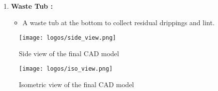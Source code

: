 \documentclass[table,french,english]{rapportCS}
\begin{document}
\begin{enumerate}[label=\arabic*.]
    \item \textbf{Waste Tub :}
    \begin{itemize}[label=$\bullet$]
        \item A waste tub at the bottom to collect residual drippings and lint.
    \end{itemize}

\end{enumerate}
\begin{figure}[h]
    \centering
    \texttt{[image: logos/side\_view.png]}
    \caption{Side view of the final CAD model}
    \label{fig:sideview}
\end{figure}
\begin{figure}[h]
    \centering
    \texttt{[image: logos/iso\_view.png]}
    \caption{Isometric view of the final CAD model}
    \label{fig:isometricview}
\end{figure}
\newpage
\end{document}

